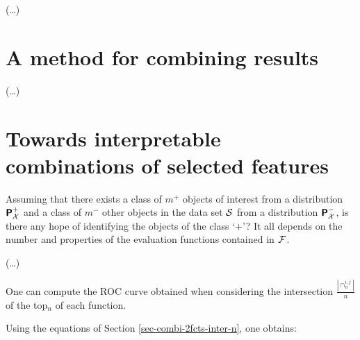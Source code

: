 \documentclass[twocolumn,english]{article}
\newcommand{\Prob}{\textbf{\textsf{\textup{P}}}}  %
\begin{document}
(\ldots)


\section{A method for combining results}
\label{sec-combinations}

(\ldots)


\section{Towards interpretable combinations of  selected features}
\label{sec-interpretable-combinations}

Assuming that there exists a class of $m^+$ objects of interest from a distribution $\Prob_{\cal X}^+$  and a class of $m^- $ other objects in the data set $\cal S$ from a distribution $\Prob_{\cal X}^-$, is there any hope of identifying the objects of the class `$+$'? It all depends on the number and properties of the evaluation functions contained in $\cal F$. 

(\ldots)


One can compute the ROC curve obtained when considering the intersection $\frac{|\cap_n^{i,j}|}{n}$ of the top$_n$ of each function. 

Using the equations of Section \ref{sec-combi-2fcts-inter-n}, one obtains:
\end{document}
